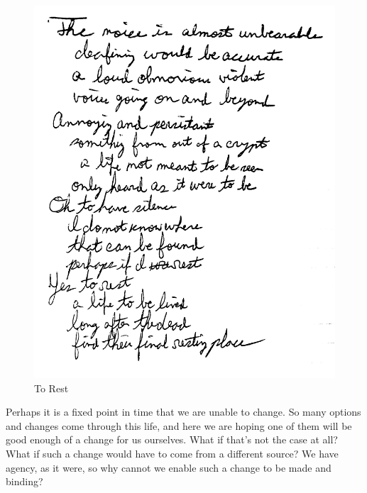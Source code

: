 \begin{figure}[h!]
  \centering
  \includegraphics[width=.5\linewidth]{2018/images/rest.jpg}
  \caption{To Rest}
  \label{fig:rest}
\end{figure}

Perhaps it is a fixed point in time that we are unable to change. So many options and
changes come through this life, and here we are hoping one of them will be good
enough of a change for us ourselves. What if that's not the case at all? What if such
a change would have to come from a different source? We have agency, as it were, so
why cannot we enable such a change to be made and binding?
